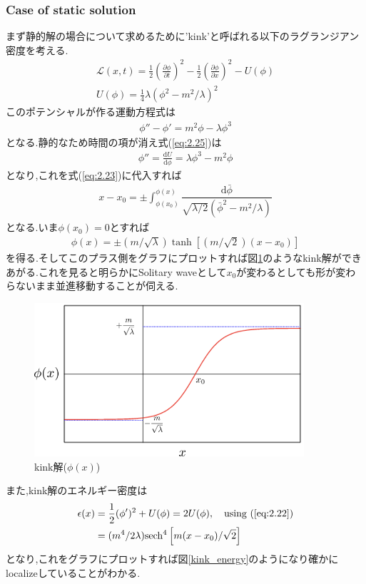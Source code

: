 \documentclass[dvipdfmx,11pt,a4paper,oneside,openany]{jsbook}
\begin{document}
\subsubsection{Case of static solution}
まず静的解の場合について求めるために'kink'と呼ばれる以下のラグランジアン密度を考える.
\begin{align}
    \mathscr{L}(x, t)=\frac{1}{2}\left(\frac{\partial \phi}{\partial t}\right)^{2}-\frac{1}{2}\left(\frac{\partial \phi}{\partial x}\right)^{2}-U(\phi)\nonumber \\
    U(\phi)=\frac{1}{4}\lambda(\phi^2-m^2/\lambda)^2\label{eq:2.24}
\end{align}
このポテンシャルが作る運動方程式は
\begin{align}
    \phi''-\phi'=m^2\phi-\lambda\phi^3\label{eq:2.25}
\end{align}
となる.静的なため時間の項が消え式(\ref{eq:2.25})は
\begin{align}
    \phi''=\frac{\mathrm{d}U}{\mathrm{d}\phi}=\lambda\phi^3-m^2\phi
\end{align}
となり,これを式(\ref{eq:2.23})に代入すれば
\begin{align}
    x-x_{0}=\pm \int_{\phi(x_0)}^{\phi(x)}\dfrac{\mathrm{d}\bar{\phi}}{\sqrt{\lambda/2}(\bar{\phi}^2-m^2/\lambda)}
\end{align}
となる.いま$\phi(x_0)=0$とすれば
\begin{align}
    \phi(x)=\pm(m/\sqrt{\lambda})\tanh\left[(m/\sqrt{2})(x-x_0)\right]\label{eq:2.28}
\end{align}
を得る.そしてこのプラス側をグラフにプロットすれば図\ref{kink_phi}のようなkink解ができあがる.これを見ると明らかにSolitary waveとして$x_0$が変わるとしても形が変わらないまま並進移動することが伺える.
\begin{figure}[H]
    \centering
    \includegraphics[width=10cm]{figure/kink_phi.png}
    \caption{kink解($\phi(x)$)}
    \label{kink_phi}
\end{figure}
また,kink解のエネルギー密度は
\begin{align}
    \epsilon(x) & =\frac{1}{2}(\phi')^2+U(\phi)=2U(\phi),\quad \text{using (\ref{eq:2.22})} \\
                & =(m^4/2\lambda)\mathrm{sech^4}\left[m(x-x_0)/\sqrt{2}\right]
\end{align}
となり,これをグラフにプロットすれば図\ref{kink_energy}のようになり確かにlocalizeしていることがわかる.
\end{document}
